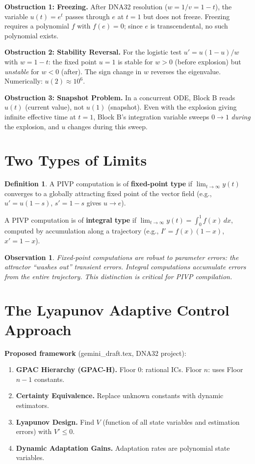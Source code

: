 \documentclass[11pt]{article}
\newtheorem{observation}{Observation}
\theoremstyle{definition}
\newtheorem{definition}{Definition}
\theoremstyle{remark}
\begin{document}
\textbf{Obstruction 1: Freezing.}
After DNA32 resolution ($w = 1/v = 1-t$), the variable $u(t) = e^t$ passes through $e$ at $t=1$ but does not freeze. Freezing requires a polynomial $f$ with $f(e) = 0$; since $e$ is transcendental, no such polynomial exists.

\textbf{Obstruction 2: Stability Reversal.}
For the logistic test $u' = u(1-u)/w$ with $w = 1-t$: the fixed point $u=1$ is stable for $w > 0$ (before explosion) but \emph{unstable} for $w < 0$ (after). The sign change in $w$ reverses the eigenvalue. Numerically: $u(2) \approx 10^6$.

\textbf{Obstruction 3: Snapshot Problem.}
In a concurrent ODE, Block B reads $u(t)$ (current value), not $u(1)$ (snapshot). Even with the explosion giving infinite effective time at $t=1$, Block B's integration variable sweeps $0 \to 1$ \emph{during} the explosion, and $u$ changes during this sweep.

\section{Two Types of Limits}

\begin{definition}
A PIVP computation is of \textbf{fixed-point type} if $\lim_{t\to\infty} y(t)$ converges to a globally attracting fixed point of the vector field (e.g., $u' = u(1-s)$, $s' = 1-s$ gives $u \to e$).

A PIVP computation is of \textbf{integral type} if $\lim_{t\to\infty} y(t) = \int_0^1 f(x)\,dx$, computed by accumulation along a trajectory (e.g., $I' = f(x)(1-x)$, $x' = 1-x$).
\end{definition}

\begin{observation}
Fixed-point computations are robust to parameter errors: the attractor ``washes out'' transient errors. Integral computations accumulate errors from the entire trajectory. This distinction is critical for PIVP compilation.
\end{observation}

\section{The Lyapunov Adaptive Control Approach}

\textbf{Proposed framework} (gemini\_draft.tex, DNA32 project):

\begin{enumerate}
  \item \textbf{GPAC Hierarchy (GPAC-H).} Floor 0: rational ICs. Floor $n$: uses Floor $n{-}1$ constants.
  \item \textbf{Certainty Equivalence.} Replace unknown constants with dynamic estimators.
  \item \textbf{Lyapunov Design.} Find $V$ (function of all state variables and estimation errors) with $V' \le 0$.
  \item \textbf{Dynamic Adaptation Gains.} Adaptation rates are polynomial state variables.
\end{enumerate}
\end{document}
